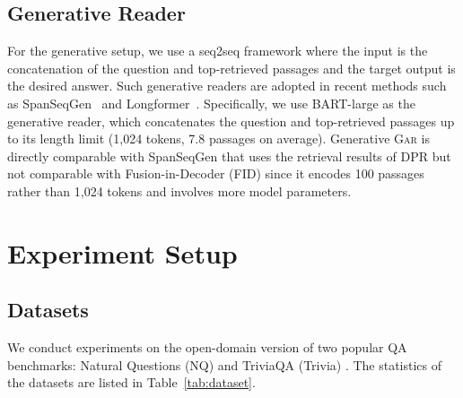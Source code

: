 \documentclass[11pt,a4paper]{article}
\newcommand{\upv}{\vspace{-.0cm}}
\newcommand{\downv}{\vspace{-.1cm}}
\newcommand{\ours}{\textsc{Gar}\xspace}
\begin{document}
\subsection{Generative Reader}
For the generative setup, we use a seq2seq framework where the input is the concatenation of the question and top-retrieved passages and the target output is the desired answer. Such generative readers are adopted in recent methods such as SpanSeqGen~\cite{min2020ambigqa} and Longformer~\cite{beltagy2020longformer}.
Specifically, we use BART-large \cite{lewis2019bart} as the generative reader, which concatenates the question and top-retrieved passages up to its length limit (1,024 tokens, 7.8 passages on average). Generative \ours is directly comparable with SpanSeqGen \cite{min2020ambigqa} that uses the retrieval results of DPR but not comparable with Fusion-in-Decoder (FID) \cite{izacard2020leveraging} since it encodes 100 passages rather than 1,024 tokens and involves more model parameters.


\section{Experiment Setup}

\subsection{Datasets}
We conduct experiments on the open-domain version of two popular QA benchmarks: Natural Questions (NQ) \cite{kwiatkowski-etal-2019-natural} and TriviaQA (Trivia) \cite{joshi-etal-2017-triviaqa}.
The statistics of the datasets are listed in Table~\ref{tab:dataset}.


\begin{table}[ht]
\centering

\upv
\caption{Dataset statistics that show the number of samples per data split, the average question (answer) length, and the number of answers for each question.
}
\label{tab:dataset}
\downv
\end{table}
\end{document}
